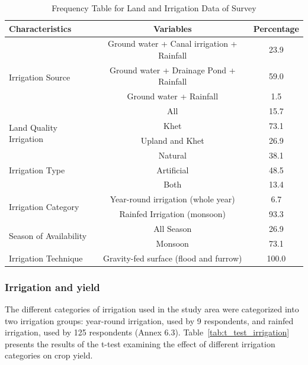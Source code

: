 \begin{table}[htbp]
    \centering
    \caption{Frequency Table for Land and Irrigation Data of Survey}
    \label{tab:irrigation_data}
    \begin{tabular}{@{}lcc@{}}
        \toprule
        \textbf{Characteristics} & \textbf{Variables} & \textbf{Percentage} \\
        \midrule
        \multirow{4}{*}{Irrigation Source} & Ground water + Canal irrigation + Rainfall & 23.9 \\
        & Ground water + Drainage Pond + Rainfall & 59.0 \\
        & Ground water + Rainfall & 1.5 \\
        & All & 15.7 \\
        \midrule
        \multirow{2}{*}{Land Quality Irrigation} & Khet & 73.1 \\
        & Upland and Khet & 26.9 \\
        \midrule
        \multirow{3}{*}{Irrigation Type} & Natural & 38.1 \\
        & Artificial & 48.5 \\
        & Both & 13.4 \\
        \midrule
        \multirow{2}{*}{Irrigation Category} & Year-round irrigation (whole year) & 6.7 \\
        & Rainfed Irrigation (monsoon) & 93.3 \\
        \midrule
        \multirow{2}{*}{Season of Availability} & All Season & 26.9 \\
        & Monsoon & 73.1 \\
        \midrule
        Irrigation Technique & Gravity-fed surface (flood and furrow) & 100.0 \\
        \bottomrule
    \end{tabular}
\end{table}

\subsubsection{Irrigation and yield}


The different categories of irrigation used in the study area were categorized into two irrigation groups: year-round irrigation, used by 9 respondents, and rainfed irrigation, used by 125 respondents (Annex 6.3). Table~\ref{tab:t_test_irrigation} presents the results of the t-test examining the effect of different irrigation categories on crop yield.

